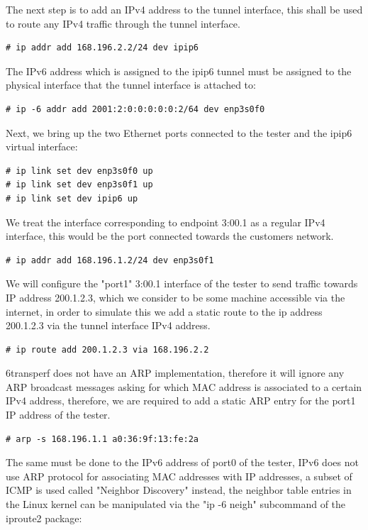 \documentclass[a4paper,12p]{article}
\begin{document}
The next step is to add an IPv4 address to the tunnel interface, this shall be used to route any IPv4 traffic through the tunnel interface.

\begin{lstlisting}
# ip addr add 168.196.2.2/24 dev ipip6
\end{lstlisting}

The IPv6 address which is assigned to the ipip6 tunnel must be assigned to the physical interface that the tunnel interface is attached to:

\begin{lstlisting}
# ip -6 addr add 2001:2:0:0:0:0:0:2/64 dev enp3s0f0
\end{lstlisting}

Next, we bring up the two Ethernet ports connected to the tester and the ipip6 virtual interface:

\begin{lstlisting}
# ip link set dev enp3s0f0 up
# ip link set dev enp3s0f1 up
# ip link set dev ipip6 up
\end{lstlisting}

We treat the interface corresponding to endpoint 3:00.1 as a regular IPv4 interface, this would be the port connected towards the customers network.

\begin{lstlisting}
# ip addr add 168.196.1.2/24 dev enp3s0f1
\end{lstlisting}

We will configure the "port1" 3:00.1 interface of the tester to send traffic towards IP address 200.1.2.3, which we consider to be some machine accessible via the internet, in order to simulate this we add a static route to the ip address 200.1.2.3 via the tunnel interface IPv4 address.

\begin{lstlisting}
# ip route add 200.1.2.3 via 168.196.2.2
\end{lstlisting}

6transperf does not have an ARP implementation, therefore it will ignore any ARP broadcast messages asking for which MAC address is associated to a certain IPv4 address, therefore, we are required to add a static ARP entry for the port1 IP address of the tester.


\begin{lstlisting}
# arp -s 168.196.1.1 a0:36:9f:13:fe:2a
\end{lstlisting}

The same must be done to the IPv6 address of port0 of the tester, IPv6 does not use ARP protocol for associating MAC addresses with IP addresses, a subset of ICMP is used called "Neighbor Discovery" instead, the neighbor table entries in the Linux kernel can be manipulated via the "ip -6 neigh" subcommand of the iproute2 package:
\end{document}
